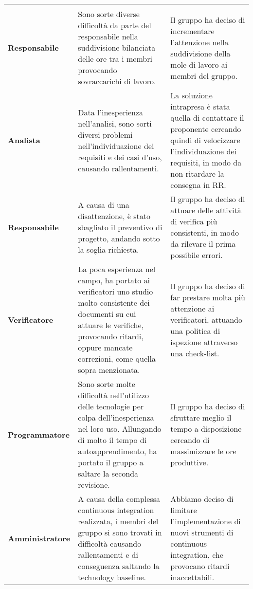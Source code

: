 \documentclass[../piano-di-qualifica.tex]{subfiles}
\begin{document}
  \begin{longtable}[H]{>{\centering\bfseries}m{4cm} >{\centering\arraybackslash}m{6cm} >{\centering\arraybackslash}m{6cm}}
    \rowcolor{darkgray!90!}
    \color{white}{\textbf{Ruolo}} & \color{white}{\textbf{Problema}} & \color{white}{\textbf{Soluzione}} \\
    Responsabile & Sono sorte diverse difficoltà da parte del responsabile nella suddivisione bilanciata delle ore tra i membri provocando sovraccarichi di lavoro. & Il gruppo ha deciso di incrementare l'attenzione nella suddivisione della mole di lavoro ai membri del gruppo. \\
    Analista & Data l'inesperienza nell'analisi, sono sorti diversi problemi nell'individuazione dei requisiti e dei casi d'uso, causando rallentamenti. & La soluzione intrapresa è stata quella di contattare il proponente cercando quindi di velocizzare l'individuazione dei requisiti, in modo da non ritardare la consegna in RR\@. \\
    Responsabile & A causa di una disattenzione, è stato sbagliato il preventivo di progetto, andando sotto la soglia richiesta. & Il gruppo ha deciso di attuare delle attività di verifica più consistenti, in modo da rilevare il prima possibile errori. \\
    Verificatore & La poca esperienza nel campo, ha portato ai verificatori uno studio molto consistente dei documenti su cui attuare le verifiche, provocando ritardi, oppure mancate correzioni, come quella sopra menzionata. & Il gruppo ha deciso di far prestare molta più attenzione ai verificatori, attuando una politica di ispezione attraverso una check-list. \\
    Programmatore & Sono sorte molte difficoltà nell'utilizzo delle tecnologie per colpa dell'inesperienza nel loro uso. Allungando di molto il tempo di autoapprendimento, ha portato il gruppo a saltare la seconda revisione. & Il gruppo ha deciso di sfruttare meglio il tempo a disposizione cercando di massimizzare le ore produttive. \\
    Amministratore & A causa della complessa continuous integration realizzata, i membri del gruppo si sono trovati in difficoltà causando rallentamenti e di conseguenza saltando la technology baseline. & Abbiamo deciso di limitare l'implementazione di nuovi strumenti di continuous integration, che provocano ritardi inaccettabili. \\
  \end{longtable}
\end{document}
